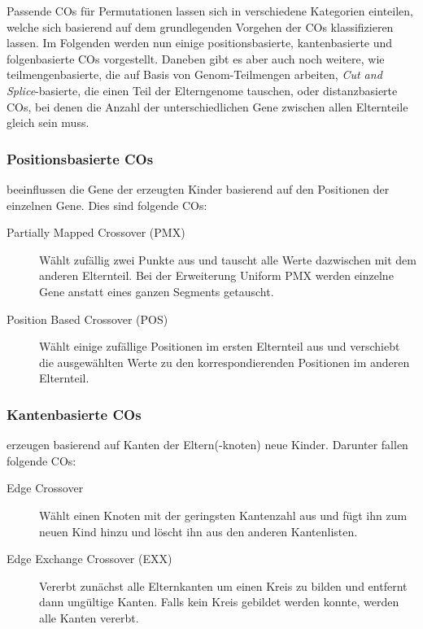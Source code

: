	Passende COs für Permutationen lassen sich in verschiedene Kategorien einteilen, welche sich basierend auf dem grundlegenden Vorgehen der COs klassifizieren lassen. Im Folgenden werden nun einige positionsbasierte, kantenbasierte und folgenbasierte COs vorgestellt. Daneben gibt es aber auch noch weitere, wie \zB teilmengenbasierte, die auf Basis von Genom-Teilmengen arbeiten, \textit{Cut and Splice}-basierte, die einen Teil der Elterngenome tauschen, oder distanzbasierte COs, bei denen die Anzahl der unterschiedlichen Gene zwischen allen Elternteile gleich sein muss.
	
	\subsubsection{Positionsbasierte COs}
	
		beeinflussen die Gene der erzeugten Kinder basierend auf den Positionen der einzelnen Gene. Dies sind \uA folgende COs:
		
		\begin{description}
			\item[Partially Mapped Crossover (PMX)] Wählt zufällig zwei Punkte aus und tauscht alle Werte dazwischen mit dem anderen Elternteil. Bei der Er\-wei\-ter\-ung Uniform PMX werden einzelne Gene anstatt eines ganzen Segments getauscht. \cite{GAforTSP} \cite{COforPermutations} \cite{COforQAP}
			\item[Position Based Crossover (POS)] Wählt einige zufällige Positionen im ersten Elternteil aus und verschiebt die ausgewählten Werte zu den korrespondierenden Positionen im anderen Elternteil. \cite{COforPermutations}
		\end{description}
		
	\subsubsection{Kantenbasierte COs}
	
		erzeugen basierend auf Kanten der Eltern(-knoten) neue Kinder. Darunter fallen \uA folgende COs:
		
		\begin{description}
			\item[Edge Crossover] Wählt einen Knoten mit der geringsten Kantenzahl aus und fügt ihn zum neuen Kind hinzu und löscht ihn aus den anderen Kantenlisten. \cite{COforPermutations}
			\item[Edge Exchange Crossover (EXX)] Vererbt zunächst alle Elternkanten um einen Kreis zu bilden und entfernt dann ungültige Kanten. Falls kein Kreis gebildet werden konnte, werden alle Kanten vererbt. \cite{EdgeCOforTSP}
		\end{description}
	
